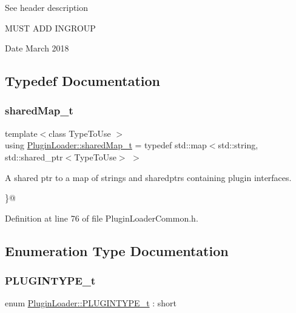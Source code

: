 See header description

M\+U\+ST A\+DD I\+N\+G\+R\+O\+UP

\begin{DoxyDate}{Date}
March 2018 
\end{DoxyDate}


\subsection{Typedef Documentation}
\mbox{\label{namespacePluginLoader_a8e505caea20d9f45155939545d29f6ba}} 
\subsubsection{\texorpdfstring{sharedMap\_t}{sharedMap\_t}}
{\footnotesize\ttfamily template$<$class Type\+To\+Use $>$ \\
using \mbox{\hyperlink{namespacePluginLoader_a8e505caea20d9f45155939545d29f6ba}{Plugin\+Loader\+::shared\+Map\+\_\+t}} = typedef std\+::map$<$std\+::string, std\+::shared\+\_\+ptr$<$Type\+To\+Use$>$ $>$}



A shared ptr to a map of strings and sharedptr\textquotesingle{}s containing plugin interfaces. 

\}@ 

Definition at line 76 of file Plugin\+Loader\+Common.\+h.



\subsection{Enumeration Type Documentation}
\mbox{\label{namespacePluginLoader_a7b1358e9577b47b5d4b16231a5a81699}} 
\subsubsection{\texorpdfstring{PLUGINTYPE\_t}{PLUGINTYPE\_t}}
{\footnotesize\ttfamily enum \mbox{\hyperlink{namespacePluginLoader_a7b1358e9577b47b5d4b16231a5a81699}{Plugin\+Loader\+::\+P\+L\+U\+G\+I\+N\+T\+Y\+P\+E\+\_\+t}} \+: short}



